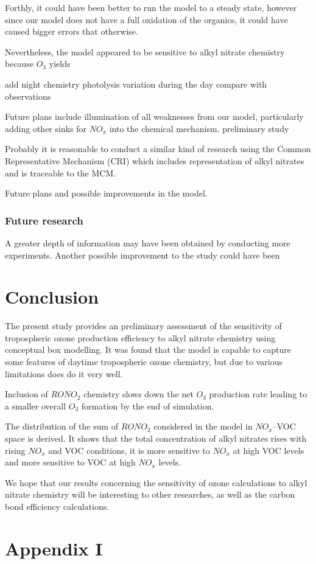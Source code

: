 \documentclass[11pt,a4paper]{article}
\begin{document}
Forthly, it could have been better to run the model to a steady state, however since our model does not have a full oxidation of the organics, it could have caused bigger errors that otherwise.

Nevertheless, the model appeared to be sensitive to alkyl nitrate chemistry because $O_3$ yields 


add night chemistry
photolysis variation during the day
compare with observations


Future plans include illumination of all weaknesses from our model, particularly adding other sinks for $NO_x$ into the chemical mechanism.
preliminary study

Probably it is reasonable to conduct a similar kind of research using the Common Representative Mechanism (CRI) which includes representation of alkyl nitrates and is traceable to the MCM.

Future plans and possible improvements in the model.

\subsubsection*{Future research}
A greater depth of information may have been obtained by conducting more experiments.
Another possible improvement to the study could have been

\section{Conclusion} \label{sec:conclusion}
The present study provides an preliminary assessment of the sensitivity of tropospheric ozone production efficiency to alkyl nitrate chemistry using conceptual box modelling. It was found that the model is capable to capture some features of daytime tropospheric ozone chemistry, but due to various limitations does do it very well.

Inclusion of $RONO_2$ chemistry slows down the net $O_3$ production rate leading to a smaller overall $O_3$ formation by the end of simulation.

The distribution of the sum of $RONO_2$ considered in the model in $NO_x$--VOC space is derived. It shows that the total concentration of alkyl nitrates rises with rising $NO_x$ and VOC conditions, it is more sensitive to $NO_x$ at high VOC levels and more sensitive to VOC at high $NO_x$ levels.


We hope that our results concerning the sensitivity of ozone calculations to alkyl nitrate chemistry will be interesting to other researches, as well as the carbon bond efficiency calculations.



\appendix
\section{Appendix I} \label{sec:appendix1}
\end{document}
